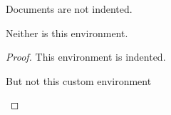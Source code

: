 \documentclass{article}
\begin{document}
Documents are not indented.

\begin{mydocument}

Neither is this environment.

\begin{proof}

This environment is indented.

\begin{myproof}

But not this custom environment

\end{myproof}

\end{proof}

\end{mydocument}
\end{document}
